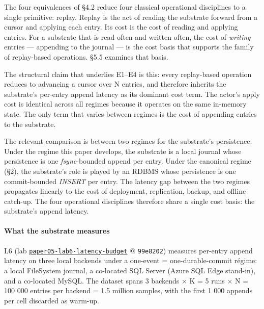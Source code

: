 \documentclass[
]{article}
\begin{document}
The four equivalences of §4.2 reduce four classical operational
disciplines to a single primitive: replay. Replay is the act of reading
the substrate forward from a cursor and applying each entry. Its cost is
the cost of reading and applying entries. For a substrate that is read
often and written often, the cost of \emph{writing} entries ---
appending to the journal --- is the cost basis that supports the family
of replay-based operations. §5.5 examines that basis.

The structural claim that underlies E1--E4 is this: every replay-based
operation reduces to advancing a cursor over N entries, and therefore
inherits the substrate's per-entry append latency as its dominant cost
term. The actor's apply cost is identical across all regimes because it
operates on the same in-memory state. The only term that varies between
regimes is the cost of appending entries to the substrate.

The relevant comparison is between two regimes for the substrate's
persistence. Under the regime this paper develops, the substrate is a
local journal whose persistence is one \emph{fsync}-bounded append per
entry. Under the canonical regime (§2), the substrate's role is played
by an RDBMS whose persistence is one commit-bounded \emph{INSERT} per
entry. The latency gap between the two regimes propagates linearly to
the cost of deployment, replication, backup, and offline catch-up. The
four operational disciplines therefore share a single cost basis: the
substrate's append latency.

\paragraph{What the substrate
measures}\label{what-the-substrate-measures-3}

L6 (lab
\href{data/paper05-lab6-latency-budget/}{\texttt{paper05-lab6-latency-budget}}
@ \texttt{99e8202}) measures per-entry append latency on three local
backends under a one-event = one-durable-commit régime: a local
FileSystem journal, a co-located SQL Server (Azure SQL Edge stand-in),
and a co-located MySQL. The dataset spans 3 backends × K = 5 runs × N =
100 000 entries per backend = 1.5 million samples, with the first 1 000
appends per cell discarded as warm-up.
\end{document}
